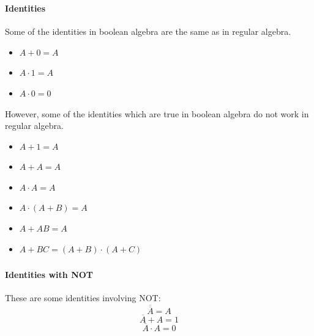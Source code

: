\documentclass[mathserif]{beamer}
\newenvironment{namedframe}[1]%
	{\begin{frame}\frametitle{\secname}\framesubtitle{#1}}
	{\end{frame}}
\newcommand{\negate}[1]{\overline{#1}}
\begin{document}
	\begin{namedframe}{Identities}
		Some of the identities in boolean algebra are the same as in regular algebra.
		\begin{itemize}[<+(1)->]
			\item $A + 0 = A$
			\item $A \cdot 1 = A$
			\item $A \cdot 0 = 0$
		\end{itemize}
		\pause
		However, some of the identities which are true in boolean algebra do not work in regular algebra.
		\begin{center}
			\begin{minipage}{0.25\textwidth}
				\begin{itemize}[<+(1)->]
					\item $A + 1 = A$
					\item $A + A = A$
					\item $A \cdot A = A$
				\end{itemize}
			\end{minipage}
			\begin{minipage}{0.65\textwidth}
				\begin{itemize}[<+(1)->]
					\item $A \cdot (A + B) = A$
					\item $A + AB = A$
					\item $A + BC = (A + B) \cdot (A + C)$
				\end{itemize}
			\end{minipage}
		\end{center}
	\end{namedframe}
	\begin{namedframe}{Identities with NOT}
		These are some identities involving NOT:
		\pause
		\[\negate{\negate{A}} = A\]
		\pause
		\[\negate{A} + A = 1\]
		\pause
		\[\negate{A} \cdot A = 0\]
	\end{namedframe}
\end{document}
